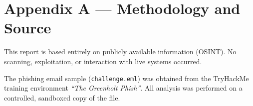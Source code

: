 \documentclass[12pt]{article}
\begin{document}
\section*{Appendix A — Methodology and Source}

This report is based entirely on publicly available information (OSINT).  
No scanning, exploitation, or interaction with live systems occurred.

The phishing email sample (\texttt{challenge.eml}) was obtained from the 
TryHackMe training environment \textit{“The Greenholt Phish”}.  
All analysis was performed on a controlled, sandboxed copy of the file.
\end{document}
